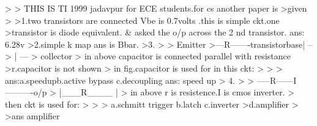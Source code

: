 >
>          THIS IS TI 1999 jadavpur for ECE students.for cs another paper is 
>given
>
>1.two transistors are connected Vbe is 0.7volts .this is simple ckt.one 
>transistor is diode equivalent. & asked the o/p across the 2 nd transistor.
 ans: 6.28v
>2.simple k map ans is Bbar.
>3.
>
>                               Emitter
>---R-------transistorbase| --
>                          | ---
>                                   collector
>             in above capacitor is connected parallel with resistance 
>r.capacitor is not shown
>             in fig.capacitor is used for in this ckt:
>
>
>             ans:a.speedupb.active bypass  c.decoupling
ans: speed up
>   4.
>
>   -----R------I----------o/p
>           |___R____ |
>                             in above r is resistence.I is cmos inverter.
>                             then ckt is used for:
>
>
>                             a.schmitt trigger b.latch  c.inverter  
>d.amplifier
>
>ans amplifier









